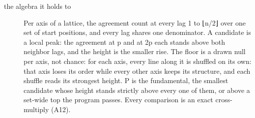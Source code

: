 \begin{description}
\item[{the algebra it holds to}] Per axis of a lattice, the agreement count at every lag 1 to ⌊n/2⌋ over one set of start positions, and every lag shares one denominator. A candidate is a local peak: the agreement at p and at 2p each stands above both neighbor lags, and the height is the smaller rise. The floor is a drawn null per axis, not chance: for each axis, every line along it is shuffled on its own: that axis loses its order while every other axis keeps its structure, and each shuffle reads its strongest height. P is the fundamental, the smallest candidate whose height stands strictly above every one of them, or above a set-wide top the program passes. Every comparison is an exact cross-multiply (A12).

\end{description}
